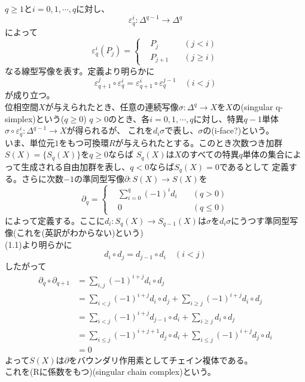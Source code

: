 \documentclass[dvipdfmx,a4paper,11pt]{jsarticle}
\begin{document}
$q\geq 1$と$i=0,1,\cdots,q$に対し、
\begin{equation*}
  \varepsilon^{i}_{q}:\Delta^{q-1}\to \Delta^{q}
\end{equation*}
によって
\begin{equation*}
  \varepsilon^{i}_{q}(P_{j})=\left\{
    \begin{alignedat}{2}
      &P_{j}\quad &(j<i)\\
      &P_{j+1}\quad &(j\geq i)
    \end{alignedat}
  \right.
\end{equation*}
なる線型写像を表す。定義より明らかに
\begin{equation}
  \varepsilon^{j}_{q+1} \circ \varepsilon^{i}_{q}=\varepsilon^{i}_{q+1}\circ \varepsilon^{j-1}_{q}\quad (i<j)
\end{equation}
が成り立つ。\\
位相空間$X$が与えられたとき、任意の連続写像$\sigma : \Delta^{q}\to X$を$X$の(singular q-simplex)という($q\geq 0$)
$q>0$のとき、各$i=0,1,\cdots,q$に対し、特異$q-1$単体$\sigma \circ \varepsilon^{i}_{q} : \Delta^{q-1}\to X$が得られるが、
これを$d_{i}\sigma$で表し、$\sigma$の(i-face?)という。\\
いま、単位元$1$をもつ可換環$R$が与えられたとする。このとき次数つき加群$S(X)=\{S_{q}(X)\}$を$q\geq 0$ならば
$S_{q}(X)$は$X$のすべての特異$q$単体の集合によって生成される自由加群を表し、$q<0$ならば$S_{q}(X)=0$であるとして
定義する。さらに次数$-1$の準同型写像$\partial : S(X)\to S(X)$を
\begin{equation*}
  \partial_{q}=\left\{
  \begin{alignedat}{2}
    &\sum_{i=0}^{q}(-1)^{i}d_{i}\quad &(q>0)\\
    &0 \quad &(q\leq 0)
  \end{alignedat}
  \right.
\end{equation*}
によって定義する。ここに$d_{i}:S_{q}(X)\to S_{q-1}(X)$は$\sigma$を$d_{i}\sigma$にうつす準同型写像(これを(英訳がわからない)という)\\
(1.1)より明らかに
\begin{equation}
  d_{i}\circ d_{j}=d_{j-1}\circ d_{i}\quad (i<j)
\end{equation}
したがって
\begin{align*}
  \partial_{q}\circ \partial_{q+1}
  &=\sum_{i,j}(-1)^{i+j}d_{i}\circ d_{j}\\
  &=\sum_{i<j}(-1)^{i+j}d_{i}\circ d_{j} + \sum_{i\geq j}(-1)^{i+j}d_{i}\circ d_{j}\\
  &=\sum_{i<j}(-1)^{i+j}d_{j-1}\circ d_{i} + \sum_{i\geq j}d_{i}\circ d_{j}\\
  &=\sum_{i\leq j}(-1)^{i+j+1}d_{j}\circ d_{i} + \sum_{i\leq j}(-1)^{i+j}d_{j}\circ d_{i}\\
  &=0
\end{align*}
よって$S(X)$は$\partial$をバウンダリ作用素としてチェイン複体である。\\
これを(Rに係数をもつ)(singular chain complex)という。\\
\end{document}
